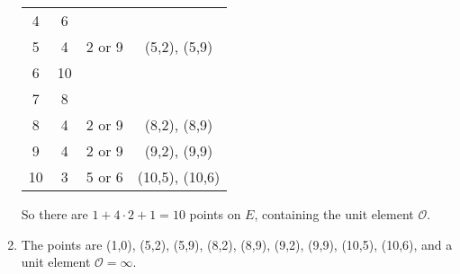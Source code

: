 \documentclass[12pt, a4paper]{article}
\begin{document}
\begin{enumerate}
\begin{center}
\begin{tabular}{c|c|c|c}
                  4 & 6 & & \\
                  5 & 4 & 2 or 9 & (5,2), (5,9)\\
                  6 & 10 & & \\
                  7 & 8 & & \\
                  8 & 4 & 2 or 9 & (8,2), (8,9)\\
                  9 & 4 & 2 or 9 & (9,2), (9,9)\\
                  10 & 3 & 5 or 6 & (10,5), (10,6)\\
                  \hline
              \end{tabular}
          \end{center}
          So there are $1+4\cdot 2+1 = 10$ points on $E$, containing the unit element $\mathcal{O}$. 
    \item The points are (1,0), (5,2), (5,9), (8,2), (8,9), (9,2), (9,9), (10,5), (10,6), and a unit element $\mathcal{O} = \infty$.
\end{enumerate}
\end{document}
